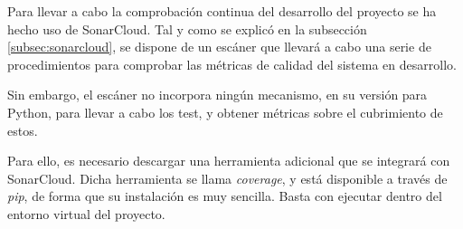 Para llevar a cabo la comprobación continua del desarrollo del proyecto se ha hecho uso de SonarCloud. Tal y como se explicó en la subsección \ref{subsec:sonarcloud}, se dispone de un escáner que llevará a cabo una serie de procedimientos para comprobar las métricas de calidad del sistema en desarrollo. 

Sin embargo, el escáner no incorpora ningún mecanismo, en su versión para Python, para llevar a cabo los test, y obtener métricas sobre el cubrimiento de estos. 

Para ello, es necesario descargar una herramienta adicional que se integrará con SonarCloud. Dicha herramienta se llama \emph{coverage}, y está disponible a través de \emph{pip}, de forma que su instalación es muy sencilla. Basta con ejecutar  dentro del entorno virtual del proyecto. 

